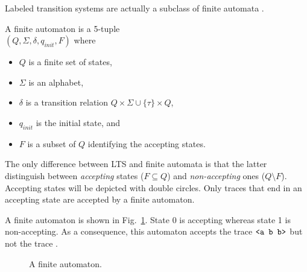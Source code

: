 Labeled transition systems are actually a subclass of finite automata \cite{Hopcroft:1979}. 

\begin{definition}
A finite automaton is a 5-tuple \\ $(Q,\Sigma,\delta,q_{init},F)$ where 
\begin{itemize}
\item $Q$ is a finite set of states, 
\item $\Sigma$ is an alphabet, 
\item $\delta$ is a transition relation $Q \times \Sigma\cup\{\tau\} \times Q$, 
\item $q_{init}$ is the initial state, and 
\item $F$ is a subset of $Q$ identifying the accepting states. 
\end{itemize}
\end{definition}

The only difference between LTS and finite automata is that the latter distinguish between \emph{accepting} states ($F \subseteq Q$) and \emph{non-accepting} ones ($Q \setminus F$). Accepting states will be depicted with double circles. Only traces that end in an accepting state are accepted by a finite automaton.

A finite automaton is shown in Fig.~\ref{image:finite-automaton}. State 0 is accepting whereas state 1 is non-accepting. As a consequence, this automaton accepts the trace $\texttt{<a b b>}$ but not the trace .

\begin{figure}[H]
\centering{}
  \caption{A finite automaton\label{image:finite-automaton}.}
\end{figure}


